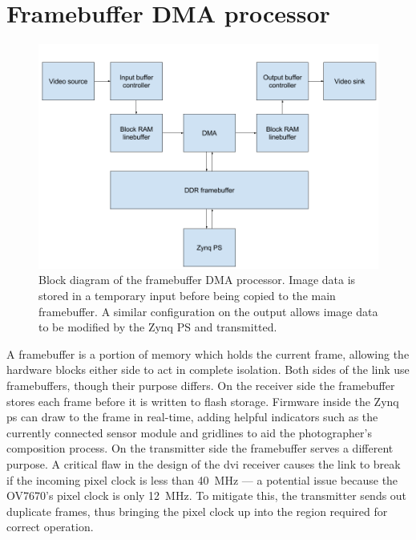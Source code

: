\section{Framebuffer DMA processor}
\label{sec:framebuffer_dma}

\begin{figure}
  \centering
  \includegraphics[width=1\textwidth]{./img/framebuffer_block_diagram.png}
  \caption{Block diagram of the framebuffer DMA processor. Image data is stored in a temporary input before being copied to the main framebuffer. A similar configuration on the output allows image data to be modified by the Zynq PS and transmitted.}
  \label{fig:framebuffer_block_diagram}
\end{figure}

A framebuffer is a portion of memory which holds the current frame, allowing the hardware blocks either side to act in complete isolation. Both sides of the link use framebuffers, though their purpose differs. On the receiver side the framebuffer stores each frame before it is written to flash storage. Firmware inside the Zynq \gls{ps}  can draw to the frame in real-time, adding helpful indicators such as the currently connected sensor module and gridlines to aid the photographer's composition process. On the transmitter side the framebuffer serves a different purpose. A critical flaw in the design of the \gls{dvi} receiver causes the link to break if the incoming pixel clock is less than \SI{40}{\mega\hertz} --- a potential issue because the OV7670's pixel clock is only \SI{12}{\mega\hertz}. To mitigate this, the transmitter sends out duplicate frames, thus bringing the pixel clock up into the region required for correct operation.

